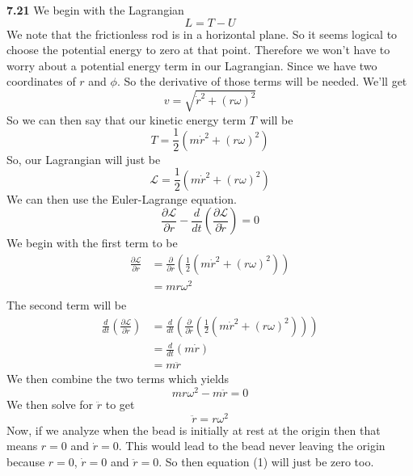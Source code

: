 \documentclass[11pt, leqno]{article}
\begin{document}
\bigskip
\noindent \textbf{7.21}
We begin with the Lagrangian 
$$ 
L = T - U 
$$ 
We note that the frictionless rod is in a horizontal plane. So it seems logical to choose the potential energy to zero at that point. Therefore we won't have to worry about a potential energy term in our Lagrangian. Since we have two coordinates of $r$ and $\phi$. So the derivative of those terms will be needed. We'll get 
$$
v = \sqrt{\dot{r}^2 + (r\omega)^2 }
$$ 
So we can then say that our kinetic energy term $T$ will be 
$$
T = \frac{1}{2} (m \dot{r}^2 + (r\omega)^2) 
$$ 
So, our Lagrangian will just be 
$$ 
\mathcal{L} = \frac{1}{2} (m \dot{r}^2 + (r\omega)^2) 
$$
We can then use the Euler-Lagrange equation. 
$$
\frac{\partial \mathcal{L}}{\partial r} - \frac{d}{dt}\left(\frac{\partial \mathcal{L}}{\partial \dot{r}}\right)= 0 
$$
We begin with the first term to be 
\begin{align*}
\frac{\partial \mathcal{L}}{\partial r} &= \frac{\partial}{\partial r}\left( \frac{1}{2} (m \dot{r}^2 + (r\omega)^2) \right) \\ 
&= mr\omega^2 \\ 
\end{align*}
The second term will be 
\begin{align*}
\frac{d}{dt}\left(\frac{\partial \mathcal{L}}{\partial \dot{r}}\right) &= \frac{d}{dt}\left(\frac{\partial }{\partial \dot{r}}\left( \frac{1}{2} (m \dot{r}^2 + (r\omega)^2) \right) \right) \\
&= \frac{d}{dt} \left( m\dot{r} \right) \\
&= m \ddot{r}
\end{align*} 
We then combine the two terms which yields 
$$ 
mr\omega^2 - m \ddot{r} = 0
$$ 
We then solve for $\ddot{r}$ to get 
\begin{equation}
\boxed{\ddot{r} = r \omega^2  }
\end{equation}
Now, if we analyze when the bead is initially at rest at the origin then that means $r = 0$ and $\dot{r} = 0$. This would lead to the bead never leaving the origin because $r = 0$, $\dot{r} = 0$ and $\ddot{r} = 0$. So then equation (1) will just be zero too. 
\end{document}
